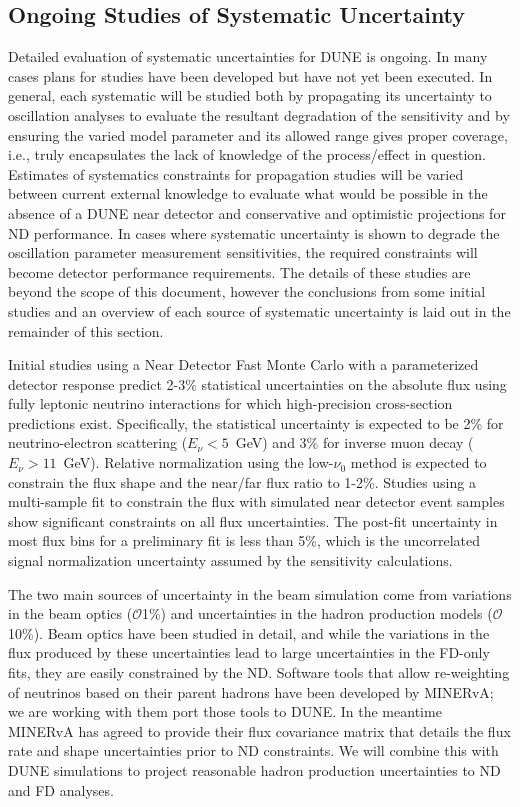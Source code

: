 \subsection{Ongoing Studies of Systematic Uncertainty}
\label{sec:syst_studies_ind}
Detailed evaluation of systematic uncertainties for DUNE is ongoing. In many cases plans for studies
have been developed but have not yet been executed. In general, each systematic will be studied both by
propagating its uncertainty to oscillation analyses to evaluate the resultant degradation of the sensitivity
and by ensuring the varied model parameter and its allowed range gives proper coverage, i.e., truly encapsulates
the lack of knowledge of the process/effect in question. Estimates of systematics constraints for
propagation studies will be varied between current external knowledge to evaluate what would be possible in the
absence of a DUNE near detector and conservative and optimistic projections
for ND performance. In cases where systematic uncertainty is shown to degrade the oscillation parameter
measurement sensitivities, the required constraints will become detector performance requirements.
The details of these studies are beyond the scope of this document, however the conclusions from some
initial studies and an overview of each source of systematic uncertainty is laid out in the remainder of this section.

Initial studies using a Near Detector Fast Monte Carlo with a parameterized detector response
predict 2-3\% statistical uncertainties on the absolute flux using fully 
leptonic neutrino interactions for which high-precision cross-section predictions 
exist. Specifically,
the statistical uncertainty is expected to be 2\% for neutrino-electron
scattering ($E_\nu<5$~GeV) and 3\% for inverse muon decay ($E_\nu>11$~GeV).
Relative normalization using the low-$\nu_0$ method is
expected to constrain the flux shape and the near/far flux ratio to 1-2\%.
Studies using a multi-sample fit  to constrain the flux with simulated near detector
event samples show significant constraints on all flux
uncertainties. The post-fit uncertainty 
in most flux bins for a preliminary fit is less
than 5\%, which is the uncorrelated \numu signal normalization
uncertainty assumed by the sensitivity calculations. 

The two main sources of uncertainty in the beam simulation come from variations in the beam optics
($\mathcal{O}$1\%) and uncertainties in the hadron production models ($\mathcal{O}$10\%).
Beam optics have been studied in detail, and while the variations in the flux produced by these uncertainties
lead to large uncertainties in the FD-only fits, they are easily constrained by the ND. Software tools that
allow re-weighting of neutrinos based on their parent hadrons have been developed by MINERvA; we are working with
them port those tools to DUNE. In the meantime MINERvA has agreed to provide their flux covariance matrix
that details the flux rate and shape uncertainties prior to ND constraints. We will combine this with DUNE
simulations to project reasonable hadron production uncertainties to ND and FD analyses.


